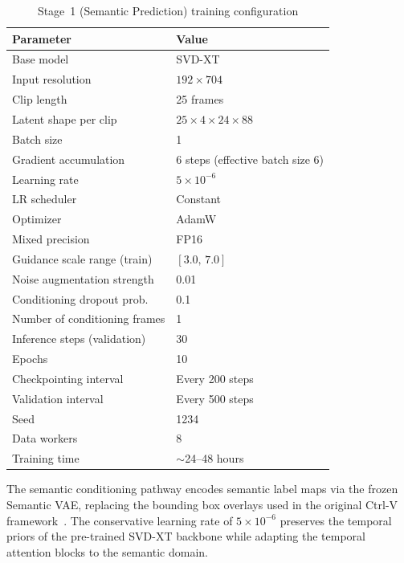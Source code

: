 \begin{table}[t]
    \centering
    \caption{Stage~1 (Semantic Prediction) training configuration}
    \label{tab:stage1_config}
    \begin{tabular}{ll}
        \toprule
        \textbf{Parameter} & \textbf{Value} \\
        \midrule
        Base model & SVD-XT~\cite{blattmann2023stable} \\
        Input resolution & $192 \times 704$ \\
        Clip length & 25 frames \\
        Latent shape per clip & $25 \times 4 \times 24 \times 88$ \\
        Batch size & 1 \\
        Gradient accumulation & 6 steps (effective batch size 6) \\
        Learning rate & $5 \times 10^{-6}$ \\
        LR scheduler & Constant \\
        Optimizer & AdamW~\cite{loshchilov2019decoupled} \\
        Mixed precision & FP16 \\
        Guidance scale range (train) & $[3.0,\, 7.0]$ \\
        Noise augmentation strength & 0.01 \\
        Conditioning dropout prob. & 0.1 \\
        Number of conditioning frames & 1 \\
        Inference steps (validation) & 30 \\
        Epochs & 10 \\
        Checkpointing interval & Every 200 steps \\
        Validation interval & Every 500 steps \\
        Seed & 1234 \\
        Data workers & 8 \\
        Training time & $\sim$24--48 hours \\
        \bottomrule
    \end{tabular}
\end{table}

The semantic conditioning pathway encodes semantic label maps via the frozen Semantic VAE, replacing the bounding box overlays used in the original Ctrl-V framework~\cite{luo2025ctrlv}. The conservative learning rate of $5 \times 10^{-6}$ preserves the temporal priors of the pre-trained SVD-XT backbone while adapting the temporal attention blocks to the semantic domain.

